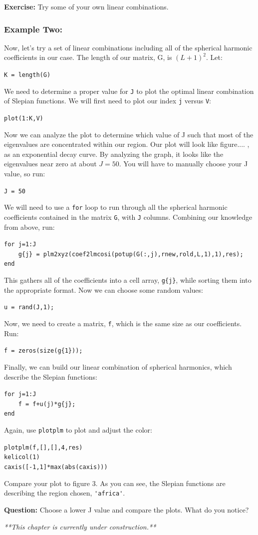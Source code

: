\documentclass[11pt]{article}
\begin{document}
\textbf{Exercise:} Try some of your own linear combinations.

\subsubsection{Example Two:}
Now, let's try a set of linear combinations including all of the spherical harmonic coefficients in our case.  The length of our matrix, G, is $(L+1)^2$.  Let:

\verb|K = length(G)|

We need to determine a proper value for \verb+J+ to plot the optimal linear combination of Slepian functions.  We will first need to plot our index \verb+j+ versus \verb+V+:

\verb|plot(1:K,V)|

Now we can analyze the plot to determine which value of J such that most of the eigenvalues are concentrated within our region.  Our plot will look like figure.... , as an exponential decay curve.  By analyzing the graph, it looks like the eigenvalues near zero at about $J=50$.  You will have to manually choose your J value, so run:

\verb+J = 50+

We will need to use a \verb+for+ loop to run through all the spherical harmonic coefficients contained in the matrix \verb+G+, with \verb+J+ columns.  Combining our knowledge from above, run:

\verb+for j=1:J+\\
\verb+    g{j} = plm2xyz(coef2lmcosi(potup(G(:,j),rnew,rold,L,1),1),res);+\\
\verb+end+

This gathers all of the coefficients into a cell array, \verb+g{j}+, while sorting them into the appropriate format.  Now we can choose some random values:

\verb+u = rand(J,1);+

Now, we need to create a matrix, \verb+f+, which is the same size as our coefficients. Run:

\verb+f = zeros(size(g{1}));+

Finally, we can build our linear combination of spherical harmonics, which describe the Slepian functions:

\verb+for j=1:J+\\
\verb|    f = f+u(j)*g{j};|\\   
\verb+end+

Again, use \verb+plotplm+ to plot and adjust the color:

\verb+plotplm(f,[],[],4,res)+\\
\verb+kelicol(1)+\\
\verb+caxis([-1,1]*max(abs(caxis)))+

Compare your plot to figure 3.  As  you can see, the Slepian functions are describing the region chosen, \verb|'africa'|.  

\textbf{Question:} Choose a lower J value and compare the plots.  What do you notice?



\textit{**This chapter is currently under construction.**}
\end{document}

